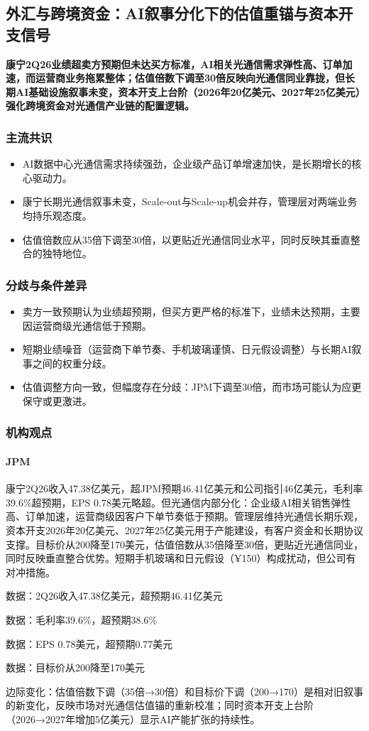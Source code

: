 \documentclass[11pt]{ctexart}
\begin{document}
\subsection{外汇与跨境资金：AI叙事分化下的估值重锚与资本开支信号}
\textbf{康宁2Q26业绩超卖方预期但未达买方标准，AI相关光通信需求弹性高、订单加速，而运营商业务拖累整体；估值倍数下调至30倍反映向光通信同业靠拢，但长期AI基础设施叙事未变，资本开支上台阶（2026年20亿美元、2027年25亿美元）强化跨境资金对光通信产业链的配置逻辑。}
\subsubsection*{主流共识}
\begin{itemize}
  \item AI数据中心光通信需求持续强劲，企业级产品订单增速加快，是长期增长的核心驱动力。
  \item 康宁长期光通信叙事未变，Scale-out与Scale-up机会并存，管理层对两端业务均持乐观态度。
  \item 估值倍数应从35倍下调至30倍，以更贴近光通信同业水平，同时反映其垂直整合的独特地位。
\end{itemize}
\subsubsection*{分歧与条件差异}
\begin{itemize}
  \item 卖方一致预期认为业绩超预期，但买方更严格的标准下，业绩未达预期，主要因运营商级光通信低于预期。
  \item 短期业绩噪音（运营商下单节奏、手机玻璃谨慎、日元假设调整）与长期AI叙事之间的权重分歧。
  \item 估值调整方向一致，但幅度存在分歧：JPM下调至30倍，而市场可能认为应更保守或更激进。
\end{itemize}
\subsubsection*{机构观点}
\paragraph{JPM} 康宁2Q26收入47.38亿美元，超JPM预期46.41亿美元和公司指引46亿美元，毛利率39.6\%超预期，EPS 0.78美元略超。但光通信内部分化：企业级AI相关销售弹性高、订单加速，运营商级因客户下单节奏低于预期。管理层维持光通信长期乐观，资本开支2026年20亿美元、2027年25亿美元用于产能建设，有客户资金和长期协议支撑。目标价从200降至170美元，估值倍数从35倍降至30倍，更贴近光通信同业，同时反映垂直整合优势。短期手机玻璃和日元假设（¥150）构成扰动，但公司有对冲措施。
{\small\color{refgray}数据：2Q26收入47.38亿美元，超预期46.41亿美元\par}
{\small\color{refgray}数据：毛利率39.6\%，超预期38.6\%\par}
{\small\color{refgray}数据：EPS 0.78美元，超预期0.77美元\par}
{\small\color{refgray}数据：目标价从200降至170美元\par}
{\small\color{refgray}边际变化：估值倍数下调（35倍→30倍）和目标价下调（200→170）是相对旧叙事的新变化，反映市场对光通信估值锚的重新校准；同时资本开支上台阶（2026→2027年增加5亿美元）显示AI产能扩张的持续性。\par}
\end{document}
